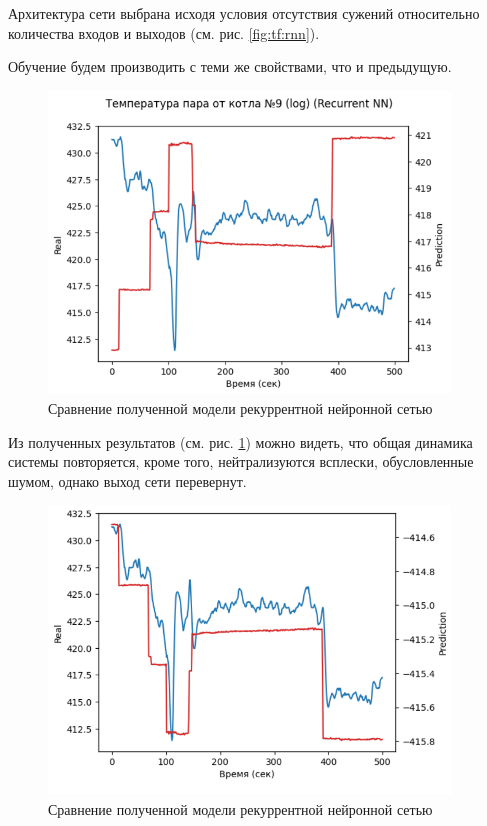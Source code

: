 Архитектура сети выбрана исходя условия отсутствия
сужений относительно количества входов и выходов (см.
рис. \ref{fig:tf:rnn}). 

Обучение будем производить с теми же свойствами, что и предыдущую. 

\begin{figure}[H]
  \begin{center}
    \includegraphics[width=0.95\textwidth]{figures/tensorflow/rnn_compare.png}
  \end{center}
  \caption{Сравнение полученной модели рекуррентной нейронной
  сетью}\label{fig:tf:cmp:rnn}
\end{figure}

Из полученных результатов (см. рис. \ref{fig:tf:cmp:rnn}) можно видеть, что
общая динамика системы повторяется, кроме того, нейтрализуются всплески,
обусловленные шумом, однако выход сети перевернут. 

\begin{figure}[H]
  \begin{center}
    \includegraphics[width=0.95\textwidth]{figures/tensorflow/rnn_compare_reversed.png}
  \end{center}
  \caption{Сравнение полученной модели рекуррентной нейронной
  сетью}\label{fig:tf:cmp:rnn:reversed}
\end{figure}


